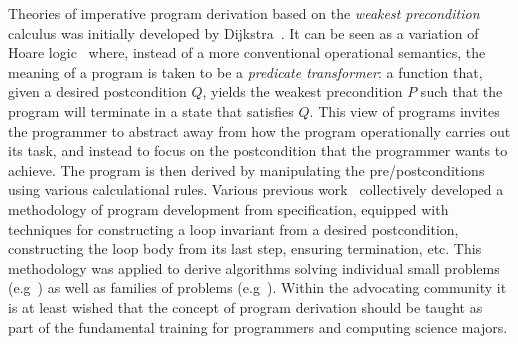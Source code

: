 \documentclass[runningheads]{llncs}
\begin{document}
Theories of imperative program derivation based on the \emph{weakest precondition} calculus was initially developed by Dijkstra~\cite{Dijkstra:75:Guarded}.
It can be seen as a variation of Hoare logic~\cite{Hoare:69:Axiomatic} where, instead of a more conventional operational semantics, the meaning of a program is taken to be a \emph{predicate transformer}: a function that, given a desired postcondition $Q$, yields the weakest precondition $P$ such that the program will terminate in a state that satisfies $Q$.
This view of programs invites the programmer to abstract away from how the program operationally carries out its task, and instead to focus on the postcondition that the programmer wants to achieve.
The program is then derived by manipulating the pre/postconditions using various calculational rules.
Various previous work~\cite{Dijkstra:76:Discipline,%
Gries:81:Science,Kaldewaij:90:Programming,Morgan:90:Programming,%
Backhouse:03:Program,Backhouse:11:Algorithmic} collectively developed a methodology of program development from specification, equipped with techniques for constructing a loop invariant from a desired postcondition, constructing the loop body from its last step, ensuring termination, etc.
This methodology was applied to derive algorithms solving individual small problems
(e.g~\cite{Rem:89:Small,Rem:90:Small}) as well as families of problems (e.g~\cite{Zantema:92:Longest}).
Within the advocating community it is at least wished that the concept of program derivation should be taught as part of the fundamental training for programmers and computing science majors.
\end{document}
